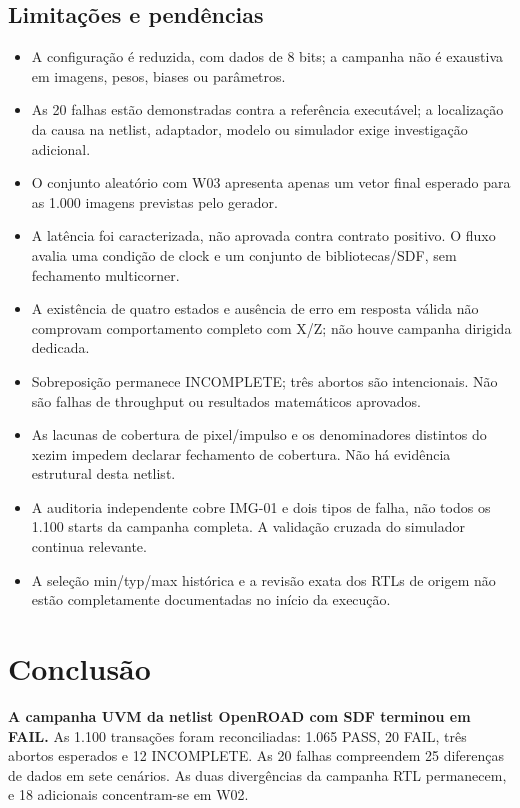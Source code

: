 \documentclass[12pt,a4paper]{article}
\begin{document}
\subsection{Limitações e pendências}
\begin{itemize}
\item A configuração é reduzida, com dados de 8 bits; a campanha não é exaustiva em imagens, pesos, biases ou parâmetros.
\item As 20 falhas estão demonstradas contra a referência executável; a localização da causa na netlist, adaptador, modelo ou simulador exige investigação adicional.
\item O conjunto aleatório com W03 apresenta apenas um vetor final esperado para as 1.000 imagens previstas pelo gerador.
\item A latência foi caracterizada, não aprovada contra contrato positivo. O fluxo avalia uma condição de clock e um conjunto de bibliotecas/SDF, sem fechamento multicorner.
\item A existência de quatro estados e ausência de erro em resposta válida não comprovam comportamento completo com X/Z; não houve campanha dirigida dedicada.
\item Sobreposição permanece INCOMPLETE; três abortos são intencionais. Não são falhas de throughput ou resultados matemáticos aprovados.
\item As lacunas de cobertura de pixel/impulso e os denominadores distintos do xezim impedem declarar fechamento de cobertura. Não há evidência estrutural desta netlist.
\item A auditoria independente cobre IMG-01 e dois tipos de falha, não todos os 1.100 starts da campanha completa. A validação cruzada do simulador continua relevante.
\item A seleção min/typ/max histórica e a revisão exata dos RTLs de origem não estão completamente documentadas no início da execução.
\end{itemize}

\section{Conclusão}
\textbf{A campanha UVM da netlist OpenROAD com SDF terminou em FAIL.} As 1.100 transações foram reconciliadas: 1.065 PASS, 20 FAIL, três abortos esperados e 12 INCOMPLETE. As 20 falhas compreendem 25 diferenças de dados em sete cenários. As duas divergências da campanha RTL permanecem, e 18 adicionais concentram-se em W02.
\end{document}
